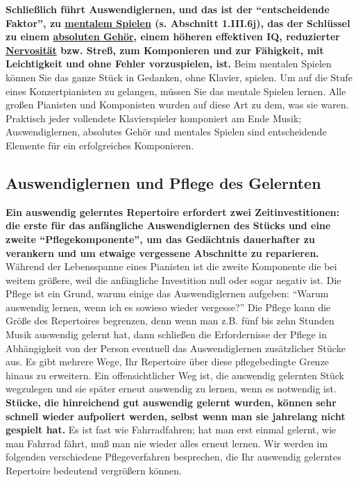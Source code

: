 \textbf{Schließlich führt Auswendiglernen, und das ist der \enquote{entscheidende Faktor}, zu \hyperlink{c1iii6tastatur}{mentalem Spielen} (s. Abschnitt 1.III.6j), das der Schlüssel zu einem \hyperlink{c1iii12}{absoluten Gehör}, einem höheren effektiven IQ, reduzierter \hyperlink{c1iii15}{Nervosität} bzw. Streß, zum Komponieren und zur Fähigkeit, mit Leichtigkeit und ohne Fehler vorzuspielen, ist.}
Beim mentalen Spielen können Sie das ganze Stück in Gedanken, ohne Klavier, spielen.
Um auf die Stufe eines Konzertpianisten zu gelangen, müssen Sie das mentale Spielen lernen.
Alle großen Pianisten und Komponisten wurden auf diese Art zu dem, was sie waren.
Praktisch jeder vollendete Klavierspieler komponiert am Ende Musik; Auswendiglernen, absolutes Gehör und mentales Spielen sind entscheidende Elemente für ein erfolgreiches Komponieren.


\subsection{Auswendiglernen und Pflege des Gelernten}\hypertarget{c1iii6c}{}

\textbf{Ein auswendig gelerntes Repertoire erfordert zwei Zeitinvestitionen: die erste für das anfängliche Auswendiglernen des Stücks und eine zweite \enquote{Pflegekomponente}, um das Gedächtnis dauerhafter zu verankern und um etwaige vergessene Abschnitte zu reparieren.}
Während der Lebensspanne eines Pianisten ist die zweite Komponente die bei weitem größere, weil die anfängliche Investition null oder sogar negativ ist.
Die Pflege ist ein Grund, warum einige das Auswendiglernen aufgeben: \enquote{Warum auswendig lernen, wenn ich es sowieso wieder vergesse?}
Die Pflege kann die Größe des Repertoires begrenzen, denn wenn man z.B. fünf bis zehn Stunden Musik auswendig gelernt hat, dann schließen die Erfordernisse der Pflege in Abhängigkeit von der Person eventuell das Auswendiglernen zusätzlicher Stücke aus.
Es gibt mehrere Wege, Ihr Repertoire über diese pflegebedingte Grenze hinaus zu erweitern.
Ein offensichtlicher Weg ist, die auswendig gelernten Stück wegzulegen und sie später erneut auswendig zu lernen, wenn es notwendig ist.
\textbf{Stücke, die hinreichend gut auswendig gelernt wurden, können sehr schnell wieder aufpoliert werden, selbst wenn man sie jahrelang nicht gespielt hat.}
Es ist fast wie Fahrradfahren; hat man erst einmal gelernt, wie man Fahrrad fährt, muß man nie wieder alles erneut lernen.
Wir werden im folgenden verschiedene Pflegeverfahren besprechen, die Ihr auswendig gelerntes Repertoire bedeutend vergrößern können. 

